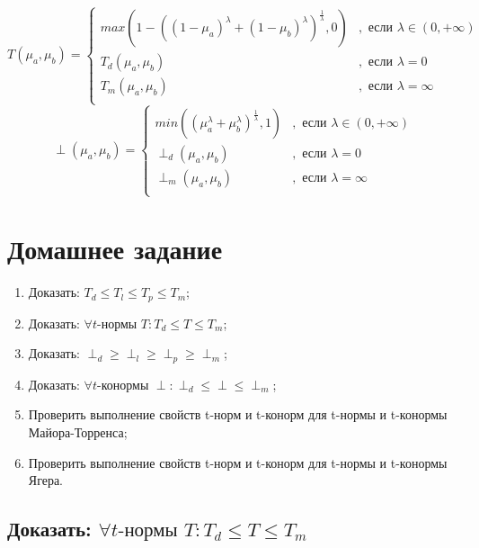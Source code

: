 \documentclass[12pt]{article}
\begin{document}
$$
    T(\mu_a, \mu_b) =
	\begin{cases}
    	max\left(1-\left((1-\mu_a)^\lambda+(1-\mu_b)^\lambda\right)^{\frac{1}{\lambda}}, 0\right) &, \text{ если }\lambda\in(0, +\infty)\\
    	T_d(\mu_a, \mu_b) &, \text{ если }\lambda=0\\
    	T_m(\mu_a, \mu_b) &, \text{ если }\lambda=\infty\\
	\end{cases}
$$
$$
\perp(\mu_a, \mu_b) =
\begin{cases}
    min\left((\mu_a^\lambda+\mu_b^\lambda)^{\frac{1}{\lambda}}, 1\right) &, \text{ если }\lambda\in(0, +\infty)\\
    \perp_d(\mu_a, \mu_b) &, \text{ если }\lambda=0\\
    \perp_m(\mu_a, \mu_b) &, \text{ если }\lambda=\infty\\
\end{cases}
$$

\section{Домашнее задание}

\begin{enumerate}
    \item Доказать: $T_d\le T_l\le T_p\le T_m$;
    \item Доказать: $\forall t\text{-нормы } T: T_d\le T \le T_m$;
    \item Доказать: $\perp_d\ge \perp_l\ge \perp_p\ge \perp_m$;
    \item Доказать: $\forall t\text{-конормы } \perp: \perp_d\le \perp \le \perp_m$;
    \item Проверить выполнение свойств t-норм и t-конорм для t-нормы и t-конормы Майора-Торренса;
    \item Проверить выполнение свойств t-норм и t-конорм для t-нормы и t-конормы Ягера.
\end{enumerate}

\subsection{Доказать: $\forall t\text{-нормы } T: T_d\le T \le T_m$}
\end{document}
